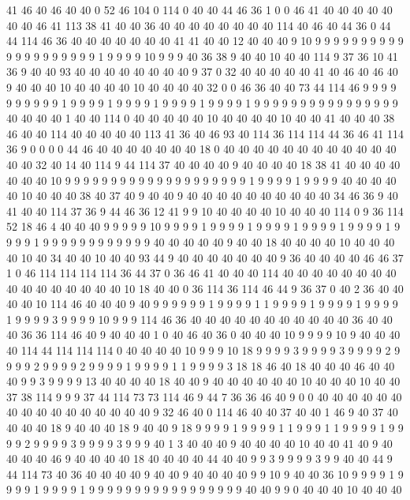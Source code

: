 41 46 40 46 40 40 0 52 46 104 0 114 0 40 40 44 46 36 1 0
0 46 41 40 40 40 40 40 40 40 46 41 113 38 41 40 40 36 40 40
40 40 40 40 40 40 114 40 46 40 44 36 0 44 44 114 46 36 40 40
40 40 40 40 40 41 41 40 40 12 40 40 40 9 10 9 9 9 9 9
9 9 9 9 9 9 9 9 9 9 9 9 9 9 9 1 9 9 9 9
10 9 9 9 40 36 38 9 40 40 10 40 40 114 9 37 36 10 41 36
9 40 40 93 40 40 40 40 40 40 40 40 9 37 0 32 40 40 40 40
40 41 40 46 40 46 40 9 40 40 40 10 40 40 40 40 10 40 40 40
40 32 0 0 46 36 40 40 73 44 114 46 9 9 9 9 9 9 9 9
9 9 1 9 9 9 9 1 9 9 9 9 1 9 9 9 9 1 9 9
9 9 1 9 9 9 9 9 9 9 9 9 9 9 9 9 9 9 9 40
40 40 40 1 40 40 114 0 40 40 40 40 40 10 40 40 40 40 10 40
40 41 40 40 40 38 46 40 40 114 40 40 40 40 40 113 41 36 40 46
93 40 114 36 114 114 44 36 46 41 114 36 9 0 0 0 0 44 46 40
40 40 40 40 40 40 18 0 40 40 40 40 40 40 40 40 40 40 40 40
40 40 32 40 14 40 114 9 44 114 37 40 40 40 40 9 40 40 40 40
18 38 41 40 40 40 40 40 40 40 10 9 9 9 9 9 9 9 9 9
9 9 9 9 9 9 9 9 9 9 9 1 9 9 9 9 1 9 9 9
9 40 40 40 40 40 10 40 40 40 38 40 37 40 9 40 40 9 40 40
40 40 40 40 40 40 40 40 34 46 36 9 40 41 40 40 114 37 36 9
44 46 36 12 41 9 9 10 40 40 40 40 10 40 40 40 114 0 9 36
114 52 18 46 4 40 40 40 9 9 9 9 9 10 9 9 9 9 1 9
9 9 9 1 9 9 9 9 1 9 9 9 9 1 9 9 9 9 1 9
9 9 9 1 9 9 9 9 9 9 9 9 9 9 9 9 40 40 40 40
40 9 40 40 18 40 40 40 40 10 40 40 40 40 10 40 34 40 40 10
40 40 93 44 9 40 40 40 40 40 40 40 9 36 40 40 40 40 46 46
37 1 0 46 114 114 114 114 36 44 37 0 36 46 41 40 40 40 114 40
40 40 40 40 40 40 40 40 40 40 40 40 40 40 40 10 18 40 40 0
36 114 36 114 46 44 9 36 37 0 40 2 36 40 40 40 40 10 114 46
40 40 40 9 40 9 9 9 9 9 9 1 9 9 9 9 1 1 9 9
9 9 1 9 9 9 9 1 9 9 9 9 1 9 9 9 9 3 9 9
9 9 10 9 9 9 114 46 36 40 40 40 40 40 40 40 40 40 40 40
36 40 40 40 36 36 114 46 40 9 40 40 40 1 0 40 46 40 36 0
40 40 40 10 9 9 9 9 10 9 40 40 40 40 114 44 114 114 114 0
40 40 40 40 10 9 9 9 10 18 9 9 9 9 3 9 9 9 9 3
9 9 9 9 2 9 9 9 9 2 9 9 9 9 2 9 9 9 9 1
9 9 9 9 1 1 9 9 9 9 3 18 18 46 40 18 40 40 40 46
40 40 40 9 9 3 9 9 9 9 13 40 40 40 40 18 40 40 9 40
40 40 40 40 40 10 40 40 40 10 40 40 37 38 114 9 9 9 37 44
114 73 73 114 46 9 44 7 36 36 46 40 9 0 0 40 40 40 40 40
40 40 40 40 40 40 40 40 40 40 40 9 32 46 40 0 114 46 40 40
37 40 40 1 46 9 40 37 40 40 40 40 18 9 40 40 40 18 9 40
40 9 18 9 9 9 9 1 9 9 9 9 1 1 9 9 9 1 1 9
9 9 9 1 9 9 9 9 2 9 9 9 9 3 9 9 9 9 3 9
9 9 40 1 3 40 40 40 9 40 40 40 40 10 40 40 41 40 9 40
40 40 40 46 9 40 40 40 40 18 40 40 40 40 44 40 40 9 9 3
9 9 9 9 3 9 9 40 40 44 9 44 114 73 40 36 40 40 40 40
9 40 40 9 40 40 40 40 9 9 10 9 40 40 36 10 9 9 9 9
1 9 9 9 9 1 9 9 9 9 1 9 9 9 9 9 9 9 9 9
9 9 9 9 9 9 9 9 40 40 9 9 0 40 40 40 10 40 40 40
